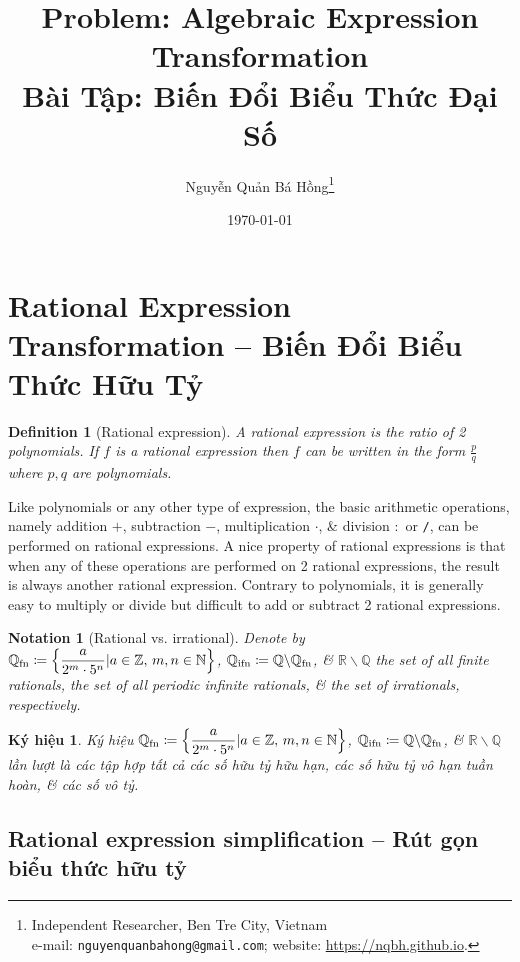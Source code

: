 \documentclass{article}
\title{Problem: Algebraic Expression Transformation\\Bài Tập: Biến Đổi Biểu Thức Đại Số}
\author{Nguyễn Quản Bá Hồng\footnote{Independent Researcher, Ben Tre City, Vietnam\\e-mail: \texttt{nguyenquanbahong@gmail.com}; website: \url{https://nqbh.github.io}.}}
\date{\today}
\newtheorem{definition}{Definition}
\newtheorem{kyhieu}{Ký hiệu}
\newtheorem{notation}{Notation}
\begin{document}
\maketitle
\tableofcontents


\section{Rational Expression Transformation -- Biến Đổi Biểu Thức Hữu Tỷ}

\begin{definition}[Rational expression]
	A {\rm rational expression} is the ratio of 2 polynomials. If $f$ is a rational expression then $f$ can be written in the form $\frac{p}{q}$ where $p,q$ are polynomials.
\end{definition}
Like polynomials or any other type of expression, the basic arithmetic operations, namely addition $+$, subtraction $-$, multiplication $\cdot$, \& division $:$ or {\tt/}, can be performed on rational expressions. A nice property of rational expressions is that when any of these operations are performed on 2 rational expressions, the result is always another rational expression. Contrary to polynomials, it is generally easy to multiply or divide but difficult to add or subtract 2 rational expressions.

\begin{notation}[Rational vs. irrational]
	Denote by $\mathbb{Q}_{\rm fn}\coloneqq\left\{\dfrac{a}{2^m\cdot5^n}|a\in\mathbb{Z},\,m,n\in\mathbb{N}\right\}$, $\mathbb{Q}_{\rm ifn}\coloneqq\mathbb{Q}\backslash\mathbb{Q}_{\rm fn}$, \& $\mathbb{R}\backslash\mathbb{Q}$ the set of all finite rationals, the set of all periodic infinite rationals, \& the set of irrationals, respectively.
\end{notation}

\begin{kyhieu}
	Ký hiệu $\mathbb{Q}_{\rm fn}\coloneqq\left\{\dfrac{a}{2^m\cdot5^n}|a\in\mathbb{Z},\,m,n\in\mathbb{N}\right\}$, $\mathbb{Q}_{\rm ifn}\coloneqq\mathbb{Q}\backslash\mathbb{Q}_{\rm fn}$, \& $\mathbb{R}\backslash\mathbb{Q}$ lần lượt là các tập hợp tất cả các số hữu tỷ hữu hạn, các số hữu tỷ vô hạn tuần hoàn, \& các số vô tỷ.
\end{kyhieu}

\subsection{Rational expression simplification -- Rút gọn biểu thức hữu tỷ}
\end{document}
